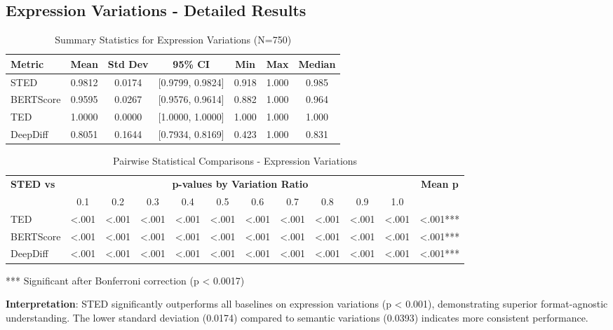 \documentclass{article}
\begin{document}
\subsection{Expression Variations - Detailed Results}

\begin{table}[H]
\centering
\caption{Summary Statistics for Expression Variations (N=750)}
\label{tab:expression-stats-detailed}
\begin{tabular}{lcccccc}
\toprule
\textbf{Metric} & \textbf{Mean} & \textbf{Std Dev} & \textbf{95\% CI} & \textbf{Min} & \textbf{Max} & \textbf{Median} \\
\midrule
STED & 0.9812 & 0.0174 & [0.9799, 0.9824] & 0.918 & 1.000 & 0.985 \\
BERTScore & 0.9595 & 0.0267 & [0.9576, 0.9614] & 0.882 & 1.000 & 0.964 \\
TED & 1.0000 & 0.0000 & [1.0000, 1.0000] & 1.000 & 1.000 & 1.000 \\
DeepDiff & 0.8051 & 0.1644 & [0.7934, 0.8169] & 0.423 & 1.000 & 0.831 \\
\bottomrule
\end{tabular}
\end{table}

\begin{table}[H]
\centering
\caption{Pairwise Statistical Comparisons - Expression Variations}
\label{tab:expression-pairwise}
\small
\begin{tabular}{lccccccccccc}
\toprule
\textbf{STED vs} & \multicolumn{10}{c}{\textbf{p-values by Variation Ratio}} & \textbf{Mean p} \\
\cmidrule{2-11}
& 0.1 & 0.2 & 0.3 & 0.4 & 0.5 & 0.6 & 0.7 & 0.8 & 0.9 & 1.0 & \\
\midrule
TED & <.001 & <.001 & <.001 & <.001 & <.001 & <.001 & <.001 & <.001 & <.001 & <.001 & <.001*** \\
BERTScore & <.001 & <.001 & <.001 & <.001 & <.001 & <.001 & <.001 & <.001 & <.001 & <.001 & <.001*** \\
DeepDiff & <.001 & <.001 & <.001 & <.001 & <.001 & <.001 & <.001 & <.001 & <.001 & <.001 & <.001*** \\
\bottomrule
\end{tabular}
\vspace{0.3em}
\small{*** Significant after Bonferroni correction (p < 0.0017)}
\end{table}

\textbf{Interpretation}: STED significantly outperforms all baselines on expression variations (p < 0.001), demonstrating superior format-agnostic understanding. The lower standard deviation (0.0174) compared to semantic variations (0.0393) indicates more consistent performance.
\end{document}
